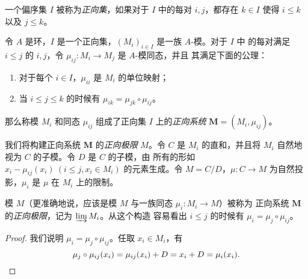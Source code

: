 \begin{problem}
  一个偏序集 $I$ 被称为\emph{正向集}，如果对于 $I$ 中的每对 $i,j$，都存在
  $k\in I$ 使得 $i\leq k$ 以及 $j\leq k$。

  令 $A$ 是环，$I$ 是一个正向集，$(M_i)_{i\in I}$ 是一族 $A$-模。对于 $I$ 中
  的每对满足 $i\leq j$ 的 $i,j$，令 $\mu_{ij}:M_i\to M_j$ 是 $A$-模同态，并且
  其满足下面的公理：
  \begin{enumerate}
    \item 对于每个 $i\in I$，$\mu_{ii}$ 是 $M_i$ 的单位映射；
    \item 当 $i\leq j\leq k$ 的时候有 $\mu_{ik}=\mu_{jk}\circ\mu_{ij}$。
  \end{enumerate}
  那么称模 $M_i$ 和同态 $\mu_{ij}$ 组成了正向集 $I$ 上的\emph{正向系统}
  $\mathbf{M}=(M_i,\mu_{ij})$。

  我们将构建正向系统 $\mathbf{M}$ 的\emph{正向极限} $M$。令 $C$ 是 $M_i$
  的直和，并且将 $M_i$ 自然地视为 $C$ 的子模。令 $D$ 是 $C$ 的子模，由
  所有的形如 $x_i-\mu_{ij}(x_i)\ (i\leq j,x_i\in M_i)$ 的元素生成。令
  $M=C/D$，$\mu:C\to M$ 为自然投影，$\mu_i$ 是 $\mu$ 在 $M_i$ 上的限制。

  模 $M$（更准确地说，应该是模 $M$ 与一族同态 $\mu_i:M_i\to M$）被称为
  正向系统 $\mathbf{M}$ 的\emph{正向极限}，记为 $\varinjlim M_i$。从这个构造
  容易看出 $i\leq j$ 的时候有 $\mu_i=\mu_j\circ\mu_{ij}$。
\end{problem}
\begin{proof}
  我们说明 $\mu_i=\mu_j\circ\mu_{ij}$。任取 $x_i\in M_i$，有
  \[
    \mu_j\circ\mu_{ij}(x_i)=\mu_{ij}(x_i)+D=x_i+D=\mu_i(x_i).\qedhere
  \]
\end{proof}

